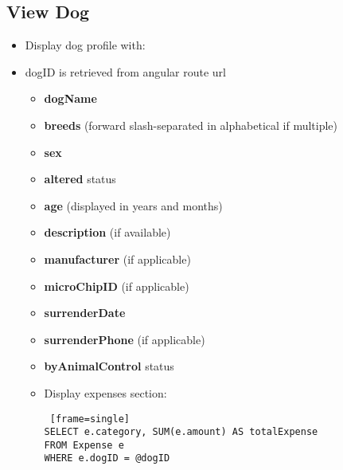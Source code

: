 \documentclass{article}
\begin{document}
\subsection{View Dog}
\begin{itemize}
    \item Display dog profile with:
    \item dogID is retrieved from angular route url
    \begin{itemize}
\begin{Verbatim} [frame=single]
SELECT
    d.dogID,
    d.name,
    COALESCE(GROUP_CONCAT(DISTINCT b.name 
    	ORDER BY b.name SEPARATOR '/'), 'Unknown') 
        AS breeds,
    d.sex,
    d.altered,
    FLOOR(d.age / 12) AS age_years,
    d.age % 12 AS age_months,
    d.description,
    dm.microchipID,
    m.manufacturer AS microchipVendor,
    d.surrender_date,
    d.surrender_phone,
    d.by_animal_control
FROM Dog d
LEFT JOIN DogBreed db ON d.dogID = db.dogID
LEFT JOIN Breed b ON db.name = b.name
LEFT JOIN DogMicrochip dm ON d.dogID = dm.dogID
LEFT JOIN Microchip m ON dm.microchipID = m.microchipID
WHERE d.dogID = @dogID;
\end{Verbatim}
\footnote{GROUP\_CONCAT() is a function in MySQL. See \url{https://www.geeksforgeeks.org/mysql-group_concat-function/}}
        \item \textbf{dogName}
        \item \textbf{breeds} (forward slash-separated in alphabetical if multiple)
        \item \textbf{sex}
        \item \textbf{altered} status
        \item \textbf{age} (displayed in years and months)
        \item \textbf{description} (if available)
        \item \textbf{manufacturer} (if applicable)
        \item \textbf{microChipID} (if applicable)
        \item \textbf{surrenderDate}
        \item \textbf{surrenderPhone} (if applicable)
        \item \textbf{byAnimalControl} status
        \item Display expenses section:
        \begin{itemize}
            \begin{Verbatim} [frame=single]
SELECT e.category, SUM(e.amount) AS totalExpense 
FROM Expense e 
WHERE e.dogID = @dogID 

\end{Verbatim}
\end{itemize}
\end{itemize}
\end{itemize}
\end{document}
